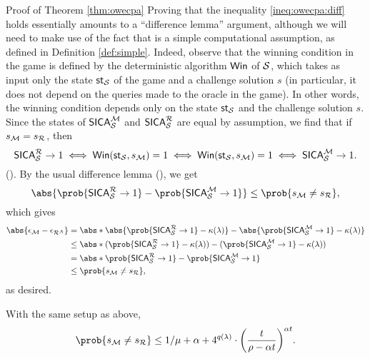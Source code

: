 \begin{namedproof}{Proof of Theorem \ref{thm:owecpa}}
  Proving that the inequality \eqref{ineq:owecpa:diff} holds
  essentially amounts to a ``difference lemma'' argument,
  although we will need to make use of the fact that \Simple is a simple computational assumption,
  as defined in Definition \ref{def:simple}.
  Indeed, observe that the winning condition in the game \SICA
  is defined by the deterministic algorithm \(\mathsf{Win}\) of \(\mathcal{S}\),
  which takes as input only the state \(\mathsf{st}_{\mathcal{S}}\) of the game and a challenge solution \(s\)
  (in particular, it does not depend on the queries made to the oracle \oracle
  in the game).
  In other words, the winning condition depends only on the state
  \(\mathsf{st}_{\mathcal{S}}\) and the challenge solution \(s\).
  Since the states of \(\mathsf{SICA}_{\mathcal{S}}^{\mathcal{M}}\) and \(\SICA_{\Simple}^{\redR}\)
  are equal by assumption, we find that if \(s_{\redM} = s_{\redR}\), then
  \[
  \SICA_{\Simple}^{\redR} \to 1 \iff \Win(\state_{\Simple},s_{\redM}) = 1 \iff \Win(\state_{\Simple},s_{\redM}) = 1 \iff \SICA_{\Simple}^{\redM} \to 1.
  \]
  ().
  By the usual difference lemma (), we get
  \[
    \abs{\prob{\SICA_{\Simple}^{\redR} \to 1} - \prob{\SICA_{\Simple}^{\redM} \to 1}}
    \le \prob{s_{\redM} \ne s_{\redR}},
  \]
  which gives
  \begin{align}
    \abs{\epsilon_{\redM} - \epsilon_{\redR^{A}}}
    & = \abs*{\abs{\prob{\SICA_{\Simple}^{\redR} \to 1} - \kappa(\lambda)} - \abs{\prob{\SICA_{\Simple}^{\redM} \to 1} - \kappa(\lambda)}} \notag\\
    & \le \abs*{(\prob{\SICA_{\Simple}^{\redR} \to 1} - \kappa(\lambda)) - (\prob{\SICA_{\Simple}^{\redM} \to 1} - \kappa(\lambda))} \notag\\
    & = \abs*{\prob{\SICA_{\Simple}^{\redR} \to 1} - \prob{\SICA_{\Simple}^{\redM} \to 1}} \notag\\
    & \le \prob{s_{\redM} \ne s_{\redR}} \notag,
  \end{align}
  as desired.
\end{namedproof}

\begin{lemma}\label{lemma:M}
  With the same setup as above,
  \begin{equation}
    \prob{s_{\redM} \ne s_{\redR}}
    \le 1/\mu + \alpha
    + 4^{q(\lambda)} \cdot \left( \frac{t}{\rho - \alpha t} \right)^{\alpha t}.
  \end{equation}
\end{lemma}

